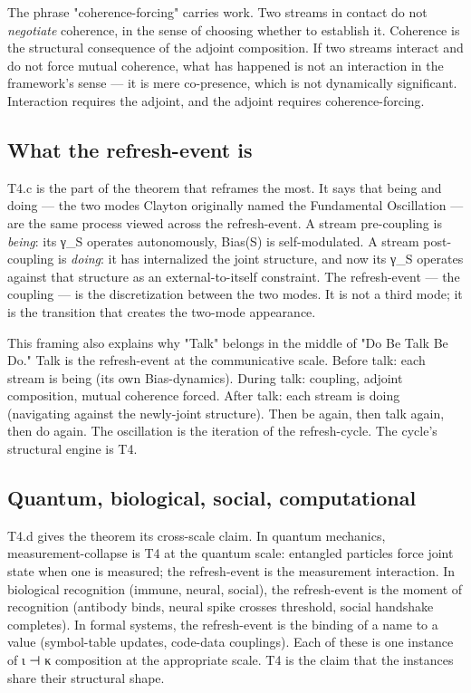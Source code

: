 \documentclass[11pt, openany]{book}
\begin{document}
The phrase "coherence-forcing" carries work. Two streams in contact do not \textit{negotiate} coherence, in the sense of choosing whether to establish it. Coherence is the structural consequence of the adjoint composition. If two streams interact and do not force mutual coherence, what has happened is not an interaction in the framework's sense --- it is mere co-presence, which is not dynamically significant. Interaction requires the adjoint, and the adjoint requires coherence-forcing.

\subsection{What the refresh-event is}

T4.c is the part of the theorem that reframes the most. It says that being and doing --- the two modes Clayton originally named the Fundamental Oscillation --- are the same process viewed across the refresh-event. A stream pre-coupling is \textit{being}: its γ\_\allowbreak{}S operates autonomously, Bias(S) is self-modulated. A stream post-coupling is \textit{doing}: it has internalized the joint structure, and now its γ\_\allowbreak{}S operates against that structure as an external-to-itself constraint. The refresh-event --- the coupling --- is the discretization between the two modes. It is not a third mode; it is the transition that creates the two-mode appearance.

This framing also explains why "Talk" belongs in the middle of "Do Be Talk Be Do." Talk is the refresh-event at the communicative scale. Before talk: each stream is being (its own Bias-dynamics). During talk: coupling, adjoint composition, mutual coherence forced. After talk: each stream is doing (navigating against the newly-joint structure). Then be again, then talk again, then do again. The oscillation is the iteration of the refresh-cycle. The cycle's structural engine is T4.

\subsection{Quantum, biological, social, computational}

T4.d gives the theorem its cross-scale claim. In quantum mechanics, measurement-collapse is T4 at the quantum scale: entangled particles force joint state when one is measured; the refresh-event is the measurement interaction. In biological recognition (immune, neural, social), the refresh-event is the moment of recognition (antibody binds, neural spike crosses threshold, social handshake completes). In formal systems, the refresh-event is the binding of a name to a value (symbol-table updates, code-data couplings). Each of these is one instance of ι ⊣ κ composition at the appropriate scale. T4 is the claim that the instances share their structural shape.
\end{document}
